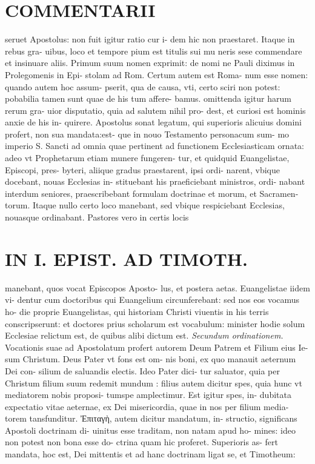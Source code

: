 \documentclass{article}
\begin{document}
\begin{pages}
\section*{COMMENTARII }
\marginpar{[ p.10 ]}\pstart seruet Apostolus: non fuit igitur ratio cur i- dem hic non praestaret. Itaque in rebus gra- uibus, loco et tempore pium est titulis sui mu neris sese commendare et insinuare aliis.  \pend\pstart Primum suum nomen exprimit: de nomi ne Pauli diximus in Prolegomenis in Epi- stolam ad Rom. Certum autem est Roma- num esse nomen: quando autem hoc assum- pserit, qua de causa, vti, certo sciri non potest: pobabilia tamen sunt quae de his tum affere- bamus. omittenda igitur harum rerum gra- uior disputatio, quia ad salutem nihil pro- dest, et curiosi est hominis anxie de his in- quirere.  \pend\pstart Apostolus sonat legatum, qui superioris alicuius domini profert, non sua mandata:est- que in nouo Testamento personacum sum- mo imperio S. Sancti ad omnia quae pertinent ad functionem Ecclesiasticam ornata: adeo vt Prophetarum etiam munere fungeren- tur, et quidquid Euangelistae, Episcopi, pres- byteri, aliique gradus praestarent, ipsi ordi- narent, vbique docebant, nouas Ecclesias in- stituebant his praeficiebant ministros, ordi- nabant interdum seniores, praescribebant formulam doctrinae et morum, et Sacramen- torum. Itaque nullo certo loco manebant, sed vbique respiciebant Ecclesias, nouasque ordinabant. Pastores vero in certis locis  \pend
\section*{IN I. EPIST. AD TIMOTH. }
\marginpar{[ p.11 ]}\pstart manebant, quos vocat Episcopos Aposto- lus, et postera aetas. Euangelistae iidem vi- dentur cum doctoribus qui Euangelium circunferebant: sed nos eos vocamus ho- die proprie Euangelistas, qui historiam Christi viuentis in his terris conscripserunt: et doctores prius scholarum est vocabulum: minister hodie solum Ecclesiae relictum est, de quibus alibi dictum est.  \pend
\textit{Secundum ordinationem. }\pstart Vocationis suae ad Apostolatum profert autorem Deum Patrem et Filium eius Ie- sum Christum. Deus Pater vt fons est om- nis boni, ex quo manauit aeternum Dei con- silium de saluandis electis. Ideo Pater dici- tur saluator, quia per Christum filium suum redemit mundum : filius autem dicitur spes, quia hunc vt mediatorem nobis proposi- tumspe amplectimur. Est igitur spes, in- dubitata expectatio vitae aeternae, ex Dei misericordia, quae in nos per filium media- torem tansfunditur.  \pend\pstart Ἐπιταγὴ, autem dicitur mandatum, in- structio, significans Apostoli doctrinam di- uinitus esse traditam, non natam apud ho- mines: ideo non potest non bona esse do- ctrina quam hic proferet. Superioris as- fert mandata, hoc est, Dei mittentis et ad hanc doctrinam ligat se, et Timotheum:  \pend

\end{pages}
\end{document}
